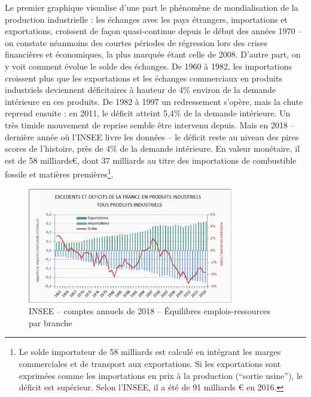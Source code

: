 \documentclass[a4paper]{article}
\begin{document}
Le premier graphique visualise d’une part le phénomène de mondialisation de la production industrielle : les échanges avec les pays étrangers, importations et exportations, croissent de façon quasi-continue depuis le début des années 1970 – on constate néanmoins des courtes périodes de régression lors des crises financières et économiques, la plus marquée étant celle de 2008. D’autre part, on y voit comment évolue le solde des échanges. De 1960 à 1982, les importations croissent plus que les exportations et les échanges commerciaux en produits industriels deviennent déficitaires à hauteur de 4\% environ de la demande intérieure en ces produits. De 1982 à 1997 un redressement s’opère, mais la chute reprend ensuite : en 2011, le déficit atteint 5,4\% de la demande intérieure. Un très timide mouvement de reprise semble être intervenu depuis. Mais en 2018  – dernière année où l’INSEE livre les données – le déficit reste au niveau des pires scores de l’histoire, près de 4\% de la demande intérieure.  En valeur monétaire, il est de 58 milliards€, dont 37 milliards au titre des importations de combustible fossile et matières premières\footnote{Le solde importateur de 58 milliards est calculé en intégrant les marges commerciales et de transport aux exportations. Si les exportations sont exprimées comme les importations en prix à la production (“sortie usine”), le déficit est supérieur. Selon l’INSEE, il a été de 91 milliards € en 2016.}.


\begin{figure}[H]
\centering
\includegraphics*[width=0.8\textwidth]{images/importations}
\caption{INSEE – comptes annuels de 2018 – Équilibres emplois-ressources par branche}
\label{fig:importations}
\end{figure}
\end{document}
